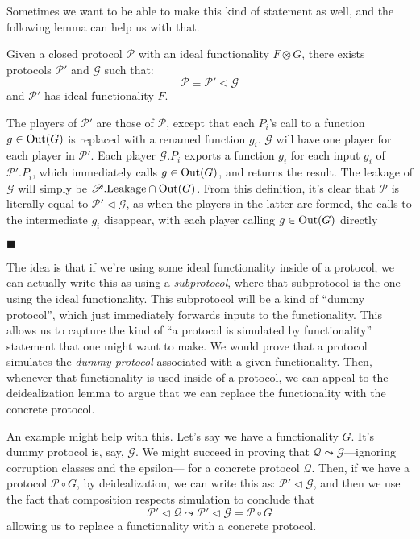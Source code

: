 Sometimes we want to be able to make this kind of statement as well,
and the following lemma can help us with that.

\begin{lemma}
  Given a closed protocol $\mathscr{P}$ with an ideal functionality $F \otimes G$,
  there exists protocols $\mathscr{P}'$ and $\mathscr{G}$
  such that:
  $$
  \mathscr{P} \equiv \mathscr{P}' \lhd \mathscr{G}
  $$
  and $\mathscr{P}'$ has ideal functionality $F$.


   The players of $\mathscr{P}'$ are those of $\mathscr{P}$,
  except that each $P_i$'s call to a function $g \in \text{Out}(G)$ is replaced with
  a renamed function $g_i$.
  $\mathscr{G}$ will have one player for each player in $\mathscr{P}'$.
  Each player $\mathscr{G}.P_i$ exports a function $g_i$ for each input
  $g_i$ of $\mathscr{P}'.P_i$, which immediately calls $g \in \text{Out}(G)$,
  and returns the result.
  The leakage of $\mathscr{G}$ will simply be $\mathscr{P}.\text{Leakage} \cap \text{Out}(G)$.
  From this definition, it's clear that $\mathscr{P}$ is literally equal
  to $\mathscr{P}' \lhd \mathscr{G}$, as when the players in the latter
  are formed, the calls to the intermediate $g_i$ disappear,
  with each player calling $g \in \text{Out}(G)$ directly

  $\blacksquare$
\end{lemma}

The idea is that if we're using some ideal functionality inside
of a protocol, we can actually write this as using
a \emph{subprotocol}, where that subprotocol is the one using
the ideal functionality.
This subprotocol will be a kind of ``dummy protocol'',
which just immediately forwards inputs to the functionality.
This allows us to capture the kind of ``a protocol is simulated by functionality''
statement that one might want to make.
We would prove that a protocol simulates the \emph{dummy protocol}
associated with a given functionality.
Then, whenever that functionality is used inside of a protocol,
we can appeal to the deidealization lemma to argue that we can
replace the functionality with the concrete protocol.

An example might help with this.
Let's say we have a functionality $G$.
It's dummy protocol is, say, $\mathscr{G}$.
We might succeed in proving that
$\mathscr{Q} \leadsto \mathscr{G}$---ignoring corruption classes and the epsilon---
for a concrete protocol $\mathscr{Q}$.
Then, if we have a protocol $\mathscr{P} \circ G$,
by deidealization, we can write this as:
$\mathscr{P}' \lhd \mathscr{G}$, and then we use the fact that composition
respects simulation to conclude that
$$
\mathscr{P}' \lhd \mathscr{Q} \leadsto 
\mathscr{P}' \lhd \mathscr{G} = \mathscr{P} \circ G
$$
allowing us to replace a functionality with a concrete protocol.

